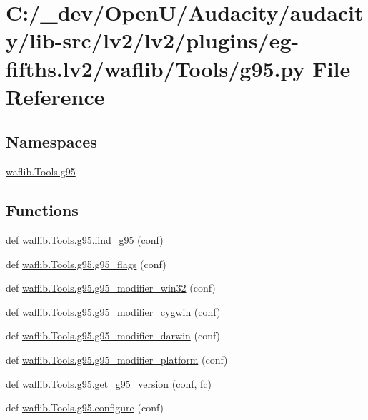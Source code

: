 \hypertarget{lv2_2plugins_2eg-fifths_8lv2_2waflib_2_tools_2g95_8py}{}\section{C\+:/\+\_\+dev/\+Open\+U/\+Audacity/audacity/lib-\/src/lv2/lv2/plugins/eg-\/fifths.lv2/waflib/\+Tools/g95.py File Reference}
\label{lv2_2plugins_2eg-fifths_8lv2_2waflib_2_tools_2g95_8py}
\subsection*{Namespaces}
\begin{DoxyCompactItemize}
\item 
 \hyperlink{namespacewaflib_1_1_tools_1_1g95}{waflib.\+Tools.\+g95}
\end{DoxyCompactItemize}
\subsection*{Functions}
\begin{DoxyCompactItemize}
\item 
def \hyperlink{namespacewaflib_1_1_tools_1_1g95_a3be6ad150899555106884ccd7f485782}{waflib.\+Tools.\+g95.\+find\+\_\+g95} (conf)
\item 
def \hyperlink{namespacewaflib_1_1_tools_1_1g95_a219eb212c9e3c16c14c4be4c75fe81cc}{waflib.\+Tools.\+g95.\+g95\+\_\+flags} (conf)
\item 
def \hyperlink{namespacewaflib_1_1_tools_1_1g95_a13f942cc0288d10a196243598d9ba608}{waflib.\+Tools.\+g95.\+g95\+\_\+modifier\+\_\+win32} (conf)
\item 
def \hyperlink{namespacewaflib_1_1_tools_1_1g95_a3363ec27e958d5ce39d5556234385475}{waflib.\+Tools.\+g95.\+g95\+\_\+modifier\+\_\+cygwin} (conf)
\item 
def \hyperlink{namespacewaflib_1_1_tools_1_1g95_a67982aa3652753344baa933e39fe4076}{waflib.\+Tools.\+g95.\+g95\+\_\+modifier\+\_\+darwin} (conf)
\item 
def \hyperlink{namespacewaflib_1_1_tools_1_1g95_a9faf0774c7c31790a714ca21fdb9806b}{waflib.\+Tools.\+g95.\+g95\+\_\+modifier\+\_\+platform} (conf)
\item 
def \hyperlink{namespacewaflib_1_1_tools_1_1g95_a753e499b2ec1d9c6960514b2f66c5b34}{waflib.\+Tools.\+g95.\+get\+\_\+g95\+\_\+version} (conf, fc)
\item 
def \hyperlink{namespacewaflib_1_1_tools_1_1g95_a7cb58685ba6d130068f6a04dc68383a1}{waflib.\+Tools.\+g95.\+configure} (conf)
\end{DoxyCompactItemize}
